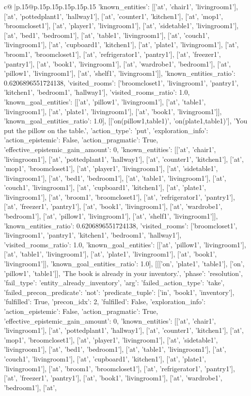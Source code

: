 \documentclass{article}
\begin{document}
{\begin{supertabular}{c@{$\;$}|p{.15\linewidth}@{}p{.15\linewidth}p{.15\linewidth}p{.15\linewidth}p{.15\linewidth}p{.15\linewidth}}
{{{'known_entities': [['at', 'chair1', 'livingroom1'], ['at', 'pottedplant1', 'hallway1'], ['at', 'counter1', 'kitchen1'], ['at', 'mop1', 'broomcloset1'], ['at', 'player1', 'livingroom1'], ['at', 'sidetable1', 'livingroom1'], ['at', 'bed1', 'bedroom1'], ['at', 'table1', 'livingroom1'], ['at', 'couch1', 'livingroom1'], ['at', 'cupboard1', 'kitchen1'], ['at', 'plate1', 'livingroom1'], ['at', 'broom1', 'broomcloset1'], ['at', 'refrigerator1', 'pantry1'], ['at', 'freezer1', 'pantry1'], ['at', 'book1', 'livingroom1'], ['at', 'wardrobe1', 'bedroom1'], ['at', 'pillow1', 'livingroom1'], ['at', 'shelf1', 'livingroom1']], 'known_entities_ratio': 0.6206896551724138, 'visited_rooms': ['broomcloset1', 'livingroom1', 'pantry1', 'kitchen1', 'bedroom1', 'hallway1'], 'visited_rooms_ratio': 1.0, 'known_goal_entities': [['at', 'pillow1', 'livingroom1'], ['at', 'table1', 'livingroom1'], ['at', 'plate1', 'livingroom1'], ['at', 'book1', 'livingroom1']], 'known_goal_entities_ratio': 1.0}}], [['on(pillow1,table1)', 'on(plate1,table1)'], 'You put the pillow on the table.', {'action_type': 'put', 'exploration_info': {'action_epistemic': False, 'action_pragmatic': True, 'effective_epistemic_gain_amount': 0, 'known_entities': [['at', 'chair1', 'livingroom1'], ['at', 'pottedplant1', 'hallway1'], ['at', 'counter1', 'kitchen1'], ['at', 'mop1', 'broomcloset1'], ['at', 'player1', 'livingroom1'], ['at', 'sidetable1', 'livingroom1'], ['at', 'bed1', 'bedroom1'], ['at', 'table1', 'livingroom1'], ['at', 'couch1', 'livingroom1'], ['at', 'cupboard1', 'kitchen1'], ['at', 'plate1', 'livingroom1'], ['at', 'broom1', 'broomcloset1'], ['at', 'refrigerator1', 'pantry1'], ['at', 'freezer1', 'pantry1'], ['at', 'book1', 'livingroom1'], ['at', 'wardrobe1', 'bedroom1'], ['at', 'pillow1', 'livingroom1'], ['at', 'shelf1', 'livingroom1']], 'known_entities_ratio': 0.6206896551724138, 'visited_rooms': ['broomcloset1', 'livingroom1', 'pantry1', 'kitchen1', 'bedroom1', 'hallway1'], 'visited_rooms_ratio': 1.0, 'known_goal_entities': [['at', 'pillow1', 'livingroom1'], ['at', 'table1', 'livingroom1'], ['at', 'plate1', 'livingroom1'], ['at', 'book1', 'livingroom1']], 'known_goal_entities_ratio': 1.0}}], [[['on', 'plate1', 'table1'], ['on', 'pillow1', 'table1']], 'The book is already in your inventory.', {'phase': 'resolution', 'fail_type': 'entity_already_inventory', 'arg': {'failed_action_type': 'take', 'failed_precon_predicate': {'not': {'predicate_tuple': ['in', 'book1', 'inventory'], 'fulfilled': True, 'precon_idx': 2}, 'fulfilled': False}}, 'exploration_info': {'action_epistemic': False, 'action_pragmatic': True, 'effective_epistemic_gain_amount': 0, 'known_entities': [['at', 'chair1', 'livingroom1'], ['at', 'pottedplant1', 'hallway1'], ['at', 'counter1', 'kitchen1'], ['at', 'mop1', 'broomcloset1'], ['at', 'player1', 'livingroom1'], ['at', 'sidetable1', 'livingroom1'], ['at', 'bed1', 'bedroom1'], ['at', 'table1', 'livingroom1'], ['at', 'couch1', 'livingroom1'], ['at', 'cupboard1', 'kitchen1'], ['at', 'plate1', 'livingroom1'], ['at', 'broom1', 'broomcloset1'], ['at', 'refrigerator1', 'pantry1'], ['at', 'freezer1', 'pantry1'], ['at', 'book1', 'livingroom1'], ['at', 'wardrobe1', 'bedroom1'], ['at', }}}
\end{supertabular}}
\end{document}
